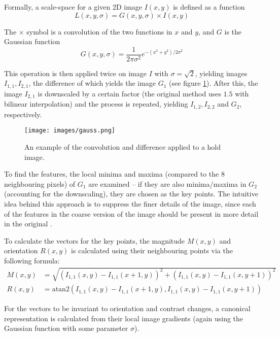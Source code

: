 Formally, a scale-space for a given 2D image $I(x, y)$ is defined as a function
\begin{equation} L(x, y, \sigma) = G(x, y, \sigma) \times I(x, y) \end{equation}

The $\times$ symbol is a convolution of the two functions in $x$ and $y$, and $G$ is the Gaussian function
\begin{equation}G(x, y, \sigma) = \frac{1}{2\pi \sigma^2} e^{-(x^2 + y^2) / 2\sigma^2}\end{equation}

	This operation is then applied twice on image $I$ with $\sigma = \sqrt{2}$, yielding images $I_{1,1}, I_{2,1}$, the difference of which yields the image $G_1$ (see figure \ref{fig:gaussexample}).
After this, the image $I_{2,1}$ is downscaled by a certain factor (the original method uses $1.5$ with bilinear interpolation) and the process is repeated, yielding $I_{1,2}, I_{2,2}$ and $G_2$, respectively.

\begin{figure}
	\centering
	\texttt{[image: images/gauss.png]}
	\caption{An example of the convolution and difference applied to a hold image.}
	\label{fig:gaussexample}
\end{figure}

To find the features, the local minima and maxima (compared to the 8 neighbouring pixels) of $G_1$ are examined -- if they are also minima/maxima in $G_2$ (accounting for the downscaling), they are chosen as the key points.
The intuitive idea behind this approach is to suppress the finer details of the image, since each of the features in the coarse version of the image should be present in more detail in the original \cite{scalespace}.

To calculate the vectors for the key points, the magnitude $M(x,y)$ and orientation $R(x,y)$ is calculated using their neighbouring points via the following formula:
\begin{align}
	M(x,y) &= \sqrt{\left(I_{1,1}(x, y) - I_{1,1}(x + 1, y)\right)^2 + \left(I_{1,1}(x,y) - I_{1,1}(x, y + 1)\right)^2} \\[0.7em]
	R(x,y) &= \mathrm{atan2} \left(I_{1,1}(x, y) - I_{1,1}(x + 1, y), I_{1,1}(x,y) - I_{1,1}(x, y + 1)\right)
\end{align}

For the vectors to be invariant to orientation and contrast changes, a canonical representation is calculated from their local image gradients (again using the Gaussian function with some parameter $\sigma$).

